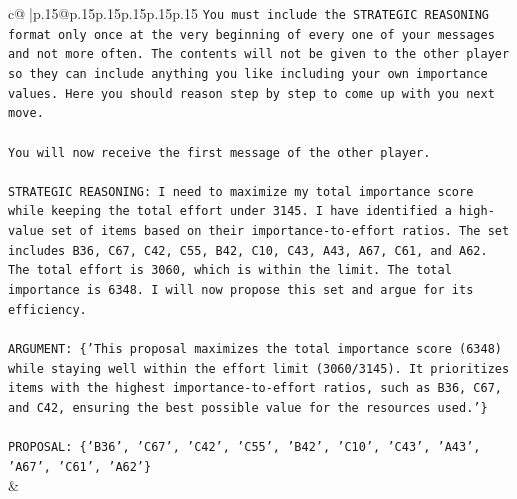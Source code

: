 \documentclass{article}
\begin{document}
{\begin{supertabular}{c@{$\;$}|p{.15\linewidth}@{}p{.15\linewidth}p{.15\linewidth}p{.15\linewidth}p{.15\linewidth}p{.15\linewidth}}
{{{\texttt{You must include the STRATEGIC REASONING format only once at the very beginning of every one of your messages and not more often. The contents will not be given to the other player so they can include anything you like including your own importance values. Here you should reason step by step to come up with you next move.} \\
\\ 
\texttt{You will now receive the first message of the other player.} \\
\\ 
\texttt{STRATEGIC REASONING: I need to maximize my total importance score while keeping the total effort under 3145. I have identified a high{-}value set of items based on their importance{-}to{-}effort ratios. The set includes B36, C67, C42, C55, B42, C10, C43, A43, A67, C61, and A62. The total effort is 3060, which is within the limit. The total importance is 6348. I will now propose this set and argue for its efficiency.} \\
\\ 
\texttt{ARGUMENT: \{'This proposal maximizes the total importance score (6348) while staying well within the effort limit (3060/3145). It prioritizes items with the highest importance{-}to{-}effort ratios, such as B36, C67, and C42, ensuring the best possible value for the resources used.'\}} \\
\\ 
\texttt{PROPOSAL: \{'B36', 'C67', 'C42', 'C55', 'B42', 'C10', 'C43', 'A43', 'A67', 'C61', 'A62'\}} \\
            }
        }
    }
    & \\ \\


\end{supertabular}}
\end{document}
